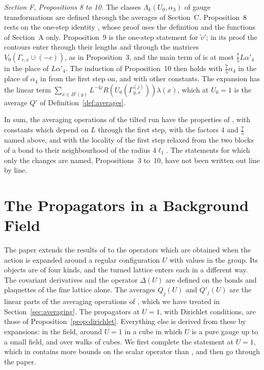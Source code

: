 \documentclass[11pt]{preprint}
\numberwithin{equation}{section}
\theoremstyle{definition}
\theoremstyle{remark}
\theoremstyle{plain}
\begin{document}
\emph{Section F, Propositions 8 to 10.} The classes $\Lambda_k(U_0, \alpha_3)$ of gauge transformations \cite[(166), (167)]{BalabanAVG} are defined through the averages of Section~C. Proposition~8 rests on the one-step identity \cite[(170)]{BalabanAVG}, whose proof \cite[(168), (169)]{BalabanAVG} uses the definition \cite[(78)]{BalabanAVG} and the functions of Section~A only. Proposition~9 is the one-step statement for $\tilde v'$; in its proof \cite[(181)--(198)]{BalabanAVG} the contours enter through their lengths and through the matrices $V_0(\Gamma_{c,x} \cup (-c))$, as in Proposition~3, and the main term of \cite[(196)]{BalabanAVG} is at most $\frac75L\alpha'_4$ in the place of $L\alpha'_4$. The induction of Proposition~10 then holds with $\frac75\alpha_4$ in the place of $\alpha_4$ in \cite[(203)]{BalabanAVG} from the first step on, and with other constants. The expansion \cite[(212)--(214)]{BalabanAVG} has the linear term $\sum_{x \in B^j(y)}L^{-4j}R(U_0(\Gamma^{(j)}_{y,x}))\lambda(x)$, which at $U_0 = 1$ is the average $Q'$ of Definition~\ref{def:averages}.

In sum, the averaging operations of the tilted run have the properties of \cite{BalabanAVG}, with constants which depend on $L$ through the first step, with the factors $4$ and $\frac75$ named above, and with the locality of the first step relaxed from the two blocks of a bond to their neighbourhood of the radius $4\ell_1$. The statements for which only the changes are named, Propositions~3 to~10, have not been written out line by line.

\section{The Propagators in a Background Field}\label{sec:background}

The paper \cite{BalabanPBG} extends the results of \cite{BalabanPRT2} to the operators which are obtained when the action is expanded around a regular configuration $U$ with values in the group. Its objects are of four kinds, and the turned lattice enters each in a different way. The covariant derivatives and the operator $\Delta(U)$ are defined on the bonds and plaquettes of the fine lattice alone. The averages $Q_j(U)$ and $Q'_j(U)$ are the linear parts of the averaging operations of \cite{BalabanAVG}, which we have treated in Section~\ref{sec:averaging}. The propagators at $U = 1$, with Dirichlet conditions, are those of Proposition~\ref{prop:dirichlet}. Everything else is derived from these by expansions: in the field, around $U = 1$ in a cube in which $U$ is a pure gauge up to a small field, and over walks of cubes. We first complete the statement at $U = 1$, which in \cite{BalabanPBG} contains more bounds on the scalar operator than \cite[Proposition~2.2]{BalabanPRT2}, and then go through the paper.
\end{document}
